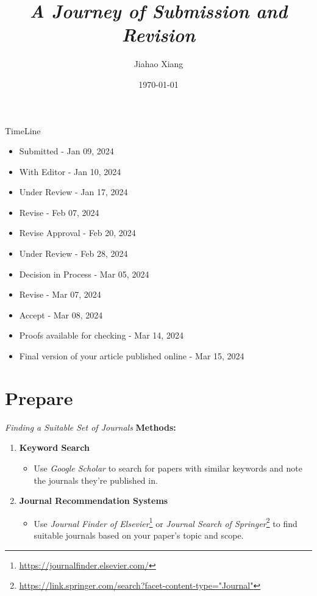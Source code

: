 \documentclass{beamer}
\title{\textit{A Journey of Submission and Revision}}
\author[xjh]{Jiahao Xiang\inst{1}}
\institute{
    \inst{1}
    Hengyang Normal University
}
\date{\today}
\begin{document}
\begin{frame}
    \titlepage
\end{frame}

\begin{frame}{TimeLine}
    \begin{itemize}
        \item Submitted - Jan 09, 2024
        \item With Editor - Jan 10, 2024
        \item Under Review - Jan 17, 2024
        \item Revise - Feb 07, 2024
        \item Revise Approval - Feb 20, 2024
        \item Under Review - Feb 28, 2024
        \item Decision in Process - Mar 05, 2024
        \item Revise - Mar 07, 2024 
        \item Accept - Mar 08, 2024 
        \item Proofs available for checking - Mar 14, 2024
        \item Final version of your article published online - Mar 15, 2024
    \end{itemize}
\end{frame}



\section{Prepare}

\begin{frame}{\textit{Finding a Suitable Set of Journals}}
    \textbf{Methods:}
    \begin{enumerate}
        \item \textbf{Keyword Search}
              \begin{itemize}
                  \item Use \textit{Google Scholar} to search for papers with similar keywords and note the journals they're published in.
              \end{itemize}
        \item \textbf{Journal Recommendation Systems}
              \begin{itemize}
                  \item Use \textit{Journal Finder of Elsevier}\footnote{\url{https://journalfinder.elsevier.com/}} or \textit{Journal Search of Springer}\footnote{\url{https://link.springer.com/search?facet-content-type="Journal"}} to find suitable journals based on your paper's topic and scope.
              \end{itemize}
    \end{enumerate}
\end{frame}
\end{document}
